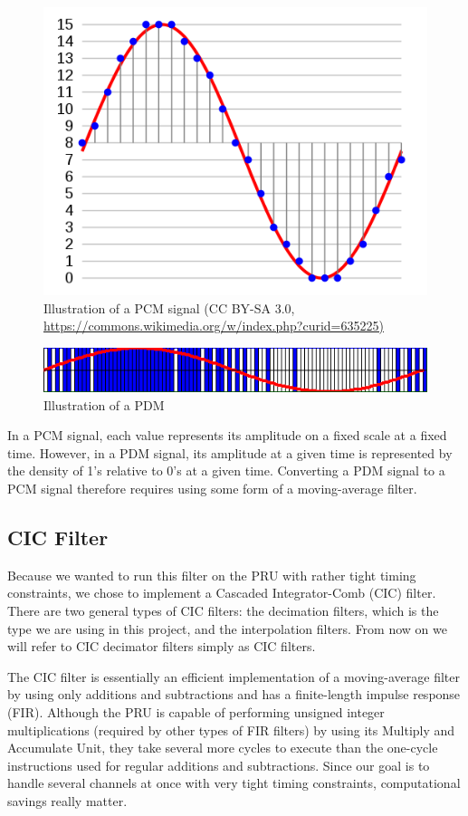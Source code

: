 \documentclass[]{report}
\begin{document}
\begin{figure}[h]
\centering
\includegraphics[width=0.7\linewidth]{Pictures/PCM.png}
\caption{Illustration of a PCM signal (CC BY-SA 3.0, \url{https://commons.wikimedia.org/w/index.php?curid=635225)}}
\end{figure}

\begin{figure}[h]
\centering
\includegraphics[width=1.0\linewidth]{Pictures/PDM.png}
\caption{Illustration of a PDM}
\end{figure}

In a PCM signal, each value represents its amplitude on a fixed scale at a fixed time. However, in a PDM signal, its amplitude at a given time is represented by the density of 1's relative to 0's at a given time. Converting a PDM signal to a PCM signal therefore requires using some form of a moving-average filter.

\hypertarget{cic-filter}{%
\subsection{CIC Filter}\label{cic-filter}}

Because we wanted to run this filter on the PRU with rather tight timing constraints, we chose to implement a Cascaded Integrator-Comb (CIC) filter. There are two general types of CIC filters: the decimation filters, which is the type we are using in this project, and the interpolation filters. From now on we will refer to CIC decimator filters simply as CIC filters.

The CIC filter is essentially an efficient implementation of a moving-average filter by using only additions and subtractions and has a finite-length impulse response (FIR). Although the PRU is capable of performing unsigned integer multiplications (required by other types of FIR filters) by using its Multiply and Accumulate Unit, they take several more cycles to execute than the one-cycle instructions used for regular additions and subtractions. Since our goal is to handle several channels at once with very tight timing constraints, computational savings really matter.
\end{document}
